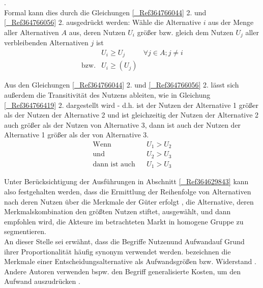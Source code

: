 .~\\
Formal kann dies durch die Gleichungen \autoref{_Ref364766044} 2. und \autoref{_Ref364766056} 2. ausgedrückt werden: Wähle die Alternative $i$ aus der Menge aller Alternativen $A$ aus, deren Nutzen ${{U}_{i}}$ größer bzw. gleich dem Nutzen ${{U}_{j}}$ aller verbleibenden Alternativen $j$ ist  \autocites[][]{bib.103} \autocites[][]{bib.325} \autocites[][]{bib.928}
\begin{align} 
& {{U}_{i}}\geq {{U}_{j}}           &     \forall  j \in A ;   j\neq i  
\label{_Ref364766044}\\
\text{bzw.} & 
  {{U}_{i}}\geq {({{U}_{j}})}⁡   & 
\label{_Ref364766056}
\end{align} 

\label{_Ref364763713}Aus den Gleichungen \autoref{_Ref364766044} 2. und \autoref{_Ref364766056} 2. lässt sich außerdem die Transitivität des Nutzens ableiten, wie in Gleichung \autoref{_Ref364766419} 2. dargestellt wird  \autocites[][]{bib.325} - d.h. ist der Nutzen der Alternative 1 größer als der Nutzen der Alternative 2 und ist gleichzeitig der Nutzen der Alternative 2 auch größer als der Nutzen von Alternative 3, dann ist auch der Nutzen der Alternative 1 größer als der von Alternative 3.
\begin{align} 
 \text{Wenn} & & {{U}_{1}}>{{U}_{2}} \\ 
 \text{und}  & &{{U}_{2}}>{{U}_{3}} \\ 
 \text{dann ist auch} & & {{U}_{1}}>{{U}_{3}} 
\label{_Ref364766419}
\end{align}

\label{_Ref364775186} Unter Berücksichtigung der Ausführungen in Abschnitt \autoref{_Ref364629843}  kann also festgehalten werden, dass die Ermittlung der Reihenfolge von Alternativen nach deren Nutzen über die Merkmale der Güter erfolgt  \autocites[][]{bib.680}, die Alternative, deren Merkmalskombination den größten Nutzen stiftet,  ausgewählt, und dann empfohlen wird, die Akteure im betrachteten Markt in homogene Gruppe zu segmentieren.~\\
An dieser Stelle sei erwähnt, dass die Begriffe \glqq Nutzen\grqq  und \glqq Aufwand\grqq  auf Grund ihrer Proportionalität häufig synonym verwendet werden. bezeichnen die Merkmale einer Entscheidungsalternative als Aufwandsgrößen bzw. Widerstand . Andere Autoren verwenden bspw. den Begriff \glqq generalisierte Kosten\grqq , um den Aufwand auszudrücken .~\\


% 
